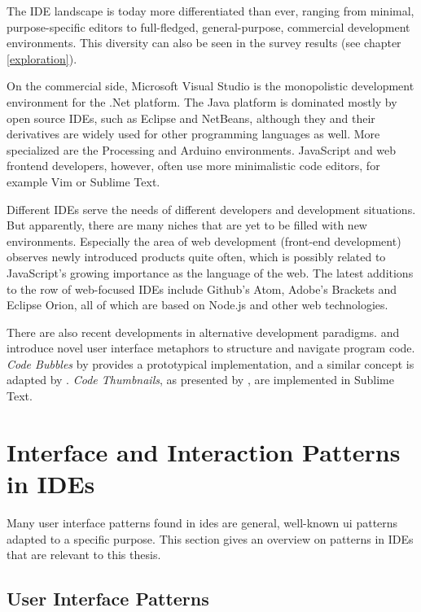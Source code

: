 The IDE landscape is today more differentiated than ever, ranging from
minimal, purpose-specific editors to full-fledged, general-purpose,
commercial development environments. This diversity can also be seen in
the survey results (see chapter \ref{exploration}).

On the commercial side, Microsoft Visual Studio is the monopolistic
development environment for the .Net platform. The Java platform is
dominated mostly by open source IDEs, such as Eclipse and NetBeans,
although they and their derivatives are widely used for other
programming languages as well. More specialized are the Processing and
Arduino environments. JavaScript and web frontend developers, however,
often use more minimalistic code editors, for example Vim or Sublime
Text.

Different IDEs serve the needs of different developers and development
situations. But apparently, there are many niches that are yet to be
filled with new environments. Especially the area of web development
(front-end development) observes newly introduced products quite often,
which is possibly related to JavaScript’s growing importance as the
language of the web. The latest additions to the row of web-focused IDEs
include Github’s Atom, Adobe’s Brackets and Eclipse Orion, all of which
are based on Node.js and other web technologies.

There are also recent developments in alternative development paradigms.
 and  introduce novel user
interface metaphors to structure and navigate program code. \emph{Code
Bubbles} by  provides a prototypical implementation,
and a similar concept is adapted by . \emph{Code
Thumbnails}, as presented by , are implemented in
Sublime Text.

\section{Interface and Interaction Patterns in
IDEs}\label{interface-and-interaction-patterns-in-ides}

Many user interface patterns found in \glspl{ide} are general,
well-known \ac{ui} patterns adapted to a specific purpose. This section
gives an overview on patterns in IDEs that are relevant to this thesis.

\subsection{User Interface Patterns}\label{user-interface-patterns}

